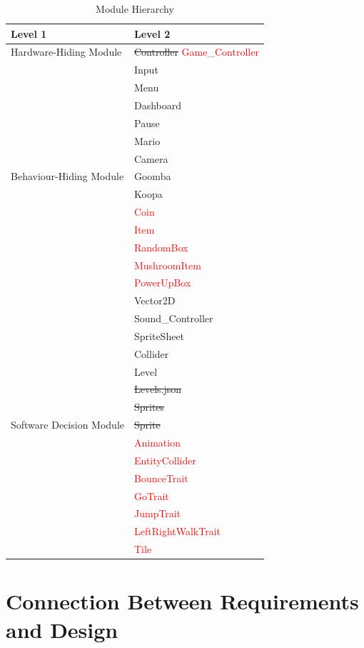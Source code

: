 \documentclass[12pt, titlepage]{article}
\begin{document}
\begin{table}[h!]
\centering
\begin{tabular}{p{} p{}}
\toprule
\textbf{Level 1} & \textbf{Level 2}\\
\midrule

{Hardware-Hiding Module} & \sout{Controller} \textcolor{red}{Game\_Controller} \\
\midrule

\multirow{13}{0.3\textwidth}{Behaviour-Hiding Module} & Input\\
& Menu \\
& Dashboard\\
& Pause\\
& Mario\\
& Camera\\
& Goomba \\
& Koopa \\
& \textcolor{red}{Coin} \\
& \textcolor{red}{Item} \\
& \textcolor{red}{RandomBox} \\
& \textcolor{red}{MushroomItem} \\
& \textcolor{red}{PowerUpBox} \\
\midrule

\multirow{15}{0.3\textwidth}{Software Decision Module} & Vector2D\\
& Sound\_Controller\\
& SpriteSheet\\
& Collider\\
& Level\\
& \sout{Levels.json}\\
& \sout{Sprites} \\
& \sout{Sprite}\\
& \textcolor{red}{Animation} \\
& \textcolor{red}{EntityCollider} \\
& \textcolor{red}{BounceTrait} \\
& \textcolor{red}{GoTrait} \\
& \textcolor{red}{JumpTrait} \\
& \textcolor{red}{LeftRightWalkTrait} \\
& \textcolor{red}{Tile} \\
\bottomrule

\end{tabular}
\caption{Module Hierarchy}
\label{TblMH}
\end{table}

\section{Connection Between Requirements and Design} \label{SecConnection}
\end{document}
